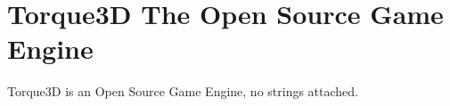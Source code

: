 

\chapter{Torque3D The Open Source Game Engine}
\label{cha:t3d-intro}

Torque3D is an Open Source Game Engine, no strings attached. 

\blindtext

